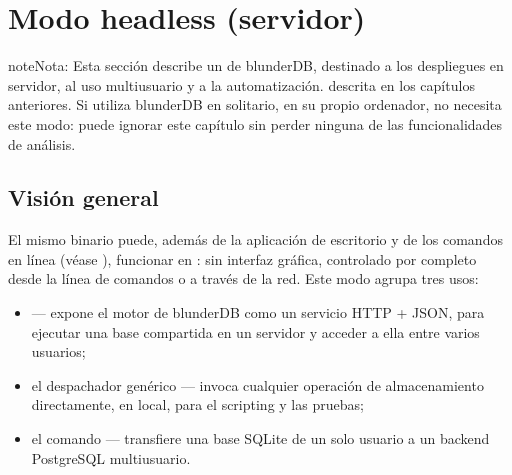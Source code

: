 \documentclass[letterpaper,10pt,spanish]{sphinxmanual}
\begin{document}
\sphinxstepscope


\section{Modo headless (servidor)}
\label{\detokenize{mode_headless:mode-headless-serveur}}\label{\detokenize{mode_headless:headless}}\label{\detokenize{mode_headless::doc}}
\begin{sphinxadmonition}{note}{Nota:}
\sphinxAtStartPar
Esta sección describe un  de blunderDB, destinado a los despliegues en servidor, al uso multiusuario y a la automatización.  descrita en los capítulos anteriores. Si utiliza blunderDB en solitario, en su propio ordenador, no necesita este modo: puede ignorar este capítulo sin perder ninguna de las funcionalidades de análisis.
\end{sphinxadmonition}


\subsection{Visión general}
\label{\detokenize{mode_headless:vue-d-ensemble}}
\sphinxAtStartPar
El mismo binario  puede, además de la aplicación de escritorio y de los comandos en línea (véase {\hyperref[\detokenize{cli:cli}]{}}), funcionar en : sin interfaz gráfica, controlado por completo desde la línea de comandos o a través de la red. Este modo agrupa tres usos:
\begin{itemize}
\item {} 
\sphinxAtStartPar
{}  — expone el motor de blunderDB como un servicio HTTP + JSON, para ejecutar una base compartida en un servidor y acceder a ella entre varios usuarios;

\item {} 
\sphinxAtStartPar
el despachador genérico  — invoca cualquier operación de almacenamiento directamente, en local, para el scripting y las pruebas;

\item {} 
\sphinxAtStartPar
el comando  — transfiere una base SQLite de un solo usuario a un backend PostgreSQL multiusuario.

\end{itemize}
\end{document}
